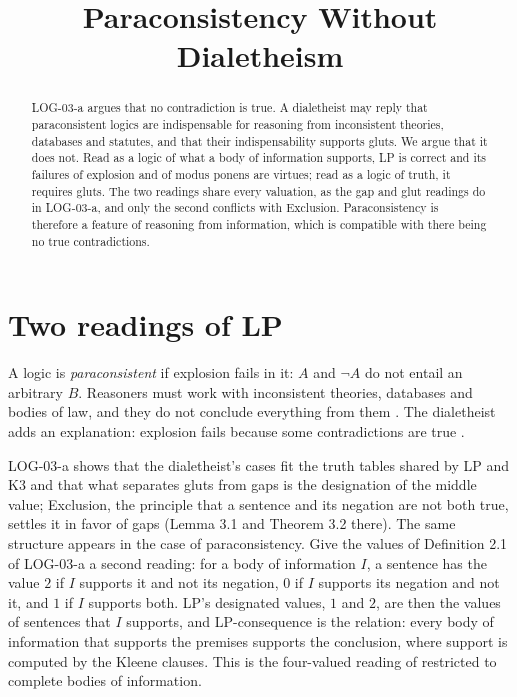 \documentclass{situationist-preprint}
\title{Paraconsistency Without Dialetheism}
\begin{document}
\maketitle

\begin{abstract}
LOG-03-a argues that no contradiction is true. A dialetheist may reply that paraconsistent logics are indispensable for reasoning from inconsistent theories, databases and statutes, and that their indispensability supports gluts. We argue that it does not. Read as a logic of what a body of information supports, LP is correct and its failures of explosion and of modus ponens are virtues; read as a logic of truth, it requires gluts. The two readings share every valuation, as the gap and glut readings do in LOG-03-a, and only the second conflicts with Exclusion. Paraconsistency is therefore a feature of reasoning from information, which is compatible with there being no true contradictions.
\end{abstract}

\section{Two readings of LP}

A logic is \emph{paraconsistent} if explosion fails in it: $A$ and $\neg A$ do not entail an arbitrary $B$. Reasoners must work with inconsistent theories, databases and bodies of law, and they do not conclude everything from them \citep{Jaskowski1969,Belnap1977}. The dialetheist adds an explanation: explosion fails because some contradictions are true \citep{Priest1979}.

LOG-03-a shows that the dialetheist's cases fit the truth tables shared by LP and K3 and that what separates gluts from gaps is the designation of the middle value; Exclusion, the principle that a sentence and its negation are not both true, settles it in favor of gaps (Lemma 3.1 and Theorem 3.2 there). The same structure appears in the case of paraconsistency. Give the values of Definition 2.1 of LOG-03-a a second reading: for a body of information $I$, a sentence has the value $2$ if $I$ supports it and not its negation, $0$ if $I$ supports its negation and not it, and $1$ if $I$ supports both. LP's designated values, $1$ and $2$, are then the values of sentences that $I$ supports, and LP-consequence is the relation: every body of information that supports the premises supports the conclusion, where support is computed by the Kleene clauses. This is the four-valued reading of \citet{Belnap1977} restricted to complete bodies of information.
\end{document}
